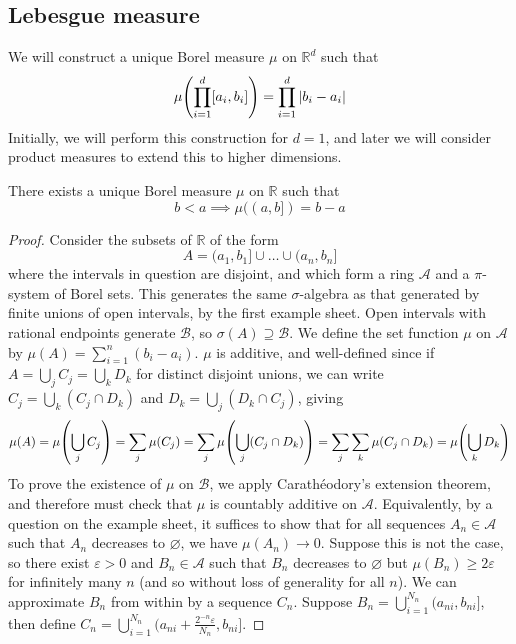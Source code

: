 \subsection{Lebesgue measure}
We will construct a unique Borel measure \( \mu \) on \( \mathbb R^d \) such that
\[ \mu\qty(\prod_{i=1}^d [a_i, b_i]) = \prod_{i=1}^d \abs{b_i - a_i} \]
Initially, we will perform this construction for \( d = 1 \), and later we will consider product measures to extend this to higher dimensions.
\begin{theorem}
	There exists a unique Borel measure \( \mu \) on \( \mathbb R \) such that
	\[ b < a \implies \mu((a,b]) = b - a \]
\end{theorem}
\begin{proof}
	Consider the subsets of \( \mathbb R \) of the form
	\[ A = (a_1,b_1] \cup \dots \cup (a_n,b_n] \]
	where the intervals in question are disjoint, and which form a ring \( \mathcal A \) and a \( \pi \)-system of Borel sets.
	This generates the same \( \sigma \)-algebra as that generated by finite unions of open intervals, by the first example sheet.
	Open intervals with rational endpoints generate \( \mathcal B \), so \( \sigma(A) \supseteq \mathcal B \).
	We define the set function \( \mu \) on \( \mathcal A \) by \( \mu(A) = \sum_{i=1}^n (b_i - a_i) \).
	\( \mu \) is additive, and well-defined since if \( A = \bigcup_j C_j = \bigcup_k D_k \) for distinct disjoint unions, we can write \( C_j = \bigcup_k (C_j \cap D_k) \) and \( D_k = \bigcup_j (D_k \cap C_j) \), giving
	\[ \mu(A) = \mu\qty(\bigcup_j C_j) = \sum_j \mu(C_j) = \sum_j \mu\qty(\bigcup_j (C_j \cap D_k)) = \sum_j \sum_k \mu(C_j \cap D_k) = \mu\qty(\bigcup_k D_k) \]
	To prove the existence of \( \mu \) on \( \mathcal B \), we apply Carath\'eodory's extension theorem, and therefore must check that \( \mu \) is countably additive on \( \mathcal A \).
	Equivalently, by a question on the example sheet, it suffices to show that for all sequences \( A_n \in \mathcal A \) such that \( A_n \) decreases to \( \varnothing \), we have \( \mu(A_n) \to 0 \).
	Suppose this is not the case, so there exist \( \varepsilon > 0 \) and \( B_n \in \mathcal A \) such that \( B_n \) decreases to \( \varnothing \) but \( \mu(B_n) \geq 2\varepsilon \) for infinitely many \( n \) (and so without loss of generality for all \( n \)).
	We can approximate \( B_n \) from within by a sequence \( C_n \).
	Suppose \( B_n = \bigcup_{i=1}^{N_n} (a_{ni},b_{ni}] \), then define \( C_n = \bigcup_{i=1}^{N_n} (a_{ni}+\frac{2^{-n}\varepsilon}{N_n}, b_{ni}] \).

\end{proof}
